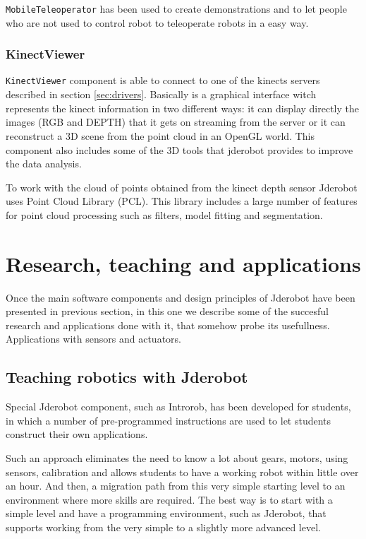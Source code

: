 \documentclass[twocolumn]{svjour3}          %
\begin{document}
\texttt{MobileTeleoperator} has been used to create demonstrations and to let people who are not used to control robot to teleoperate robots in a easy way.

\subsubsection{KinectViewer}

\texttt{KinectViewer} component is able to connect to one of the kinects servers described in section \ref{sec:drivers}. Basically is a graphical interface witch represents the kinect information in two different ways: it can display directly the images (RGB and DEPTH) that it gets on streaming from the server or it can reconstruct a 3D scene from the point cloud in an OpenGL world. This component also includes some of the 3D tools that jderobot provides to improve the data analysis. 

To work with the cloud of points obtained from the kinect depth sensor Jderobot uses Point Cloud Library (PCL). This library includes a large number of features for point cloud processing such as filters, model fitting and segmentation. 

\section{Research, teaching and applications}
\label{sec:applications}

Once the main software components and design principles of Jderobot have been presented in previous section, in this one we describe some of the succesful research and applications done with it, that somehow probe its usefullness. Applications with sensors and actuators.

\subsection{Teaching robotics with Jderobot}

Special Jderobot component, such as Introrob, has been developed for students, in which a number of pre-programmed instructions are used to let students construct their own applications.

Such an approach eliminates the need to know a lot about gears, motors, using sensors, calibration and allows students to have a working robot within little over an hour. And then, a migration path from this very simple starting level to an environment where more skills are required. The best way is to start with a simple level and have a programming environment, such as Jderobot, that supports working from the very simple to a slightly more advanced level.
\end{document}
